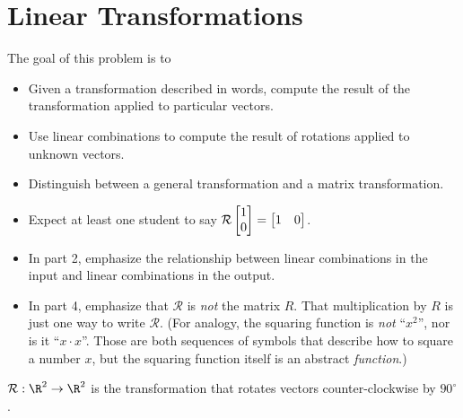 	\bookonlynewpage
\section*{Linear Transformations}
\vspace{-1.5em}

	\question
	\begin{annotation}
		\begin{goals}

			The goal of this problem is to
			\begin{itemize}
				\item Given a transformation described in words, compute the result
					of the transformation applied to particular vectors.
				\item Use linear combinations to compute the result of rotations applied
					to unknown vectors.
				\item Distinguish between a general transformation and a matrix transformation.
			\end{itemize}
		\end{goals}

		\begin{notes}
			\begin{itemize}
				\item Expect at least one student to say $\mathcal R\mat{1\\0}=\mat{1&0}$.
				\item In part 2, emphasize the relationship between linear combinations
					in the input and linear combinations in the output.
				\item In part 4, emphasize that $\mathcal R$ is \emph{not} the matrix $R$.
					That multiplication by $R$ is just one way to write $\mathcal R$.
					(For analogy, the squaring function is \emph{not} ``$x^2$'', nor is it ``$x\cdot x$''.
					Those are both sequences of symbols that describe how to square a number $x$, but
					the squaring function itself is an abstract \emph{function}.)

			\end{itemize}
		\end{notes}
	\end{annotation}
	$\mathcal R:\R^2\to\R^2$ is the transformation that rotates vectors counter-clockwise
	by $90^\circ$.
